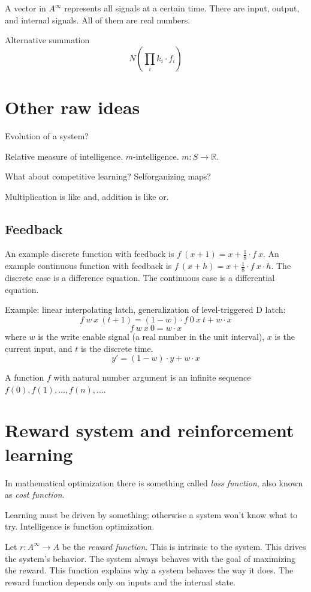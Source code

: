 A vector in \(A^\infty\) represents all signals at a certain time.
There are input, output, and internal signals.
All of them are real numbers.

Alternative summation
\[
    N \left( \prod_i k_i \cdot f_i \right)
\]

\section{Other raw ideas}

Evolution of a system?

Relative measure of intelligence.
\(m\)-intelligence.
\(m : S \to \mathbb{R}\).

What about competitive learning? Selforganizing maps?

Multiplication is like and, addition is like or.

\subsection{Feedback}

An example discrete function with feedback is
\( f~(x+1) = x + \frac{1}{8} \cdot f~x \).
An example continuous function with feedback is
\( f~(x+h) = x + \frac{1}{8} \cdot f~x \cdot h \).
The discrete case is a difference equation.
The continuous case is a differential equation.

Example: linear interpolating latch,
generalization of level-triggered D latch:
\[
    f~w~x~(t+1) = (1 - w) \cdot f~0~x~t + w \cdot x
\]
\[
    f~w~x~0 = w \cdot x
\]
where \(w\) is the write enable signal
(a real number in the unit interval),
\(x\) is the current input,
and \(t\) is the discrete time.
\[
    y' = (1 - w) \cdot y + w \cdot x
\]

A function \(f\) with natural number argument
is an infinite sequence \(f(0), f(1), \ldots, f(n), \ldots\).

\section{Reward system and reinforcement learning}

In mathematical optimization there is something called
\emph{loss function}, also known as \emph{cost function}.

Learning must be driven by something;
otherwise a system won't know what to try.
Intelligence is function optimization.

Let \( r : A^\infty \to A \) be the \emph{reward function}.
This is intrinsic to the system.
This drives the system's behavior.
The system always behaves with the goal of maximizing the reward.
This function explains why a system behaves the way it does.
The reward function depends only on inputs and the internal state.

